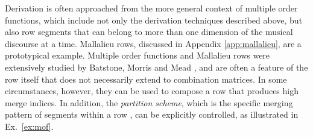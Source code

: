 
Derivation is often approached from the more general context of multiple order functions, which include not only the derivation techniques described above, but also row segments that can belong to more than one dimension of the musical discourse at a time. Mallalieu rows, discussed in Appendix \ref{app:mallalieu}, are a prototypical example. Multiple order functions and Mallalieu rows were extensively studied by Batstone, Morris and Mead \cite{Batstone1972a, Batstone1972b, Morris1977, Mead1988, Mead1989}, and are often a feature of the row itself that does not necessarily extend to combination matrices. In some circumstances, however, they can be used to compose a row that produces high merge indices. In addition, the \emph{partition scheme}, which is the specific merging pattern of segments within a row \cite[245]{Morris1977}, can be explicitly controlled, as illustrated in Ex.~\ref{ex:mof}.

